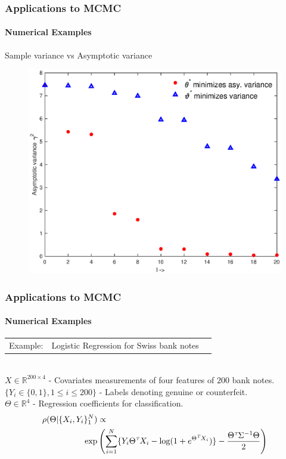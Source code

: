 \documentclass[xcolor=dvipsnames, subsection=false]{beamer}
\def\alertb#1{\alert{\color{BrickRed}  #1}}
\def\alertb#1{\alert{\color{BrickRed}  #1}}
\def\transpose{{\hbox{\it\tiny T}}}
\newcommand{\field}[1]{\mathbb{#1}}
\def\Re{\field{R}}
\newcommand{\pr}{\rho}
\begin{document}
\begin{frame}
\frametitle{Applications to MCMC}
\framesubtitle{Numerical Examples}
Sample variance vs Asymptotic variance
\begin{figure}[]
	\includegraphics[width = .6\hsize]{x_var_vs_asym_var.eps}
\end{figure}
\end{frame}

\begin{frame}
\frametitle{Applications to MCMC}
\framesubtitle{Numerical Examples}
\begin{tabular}{lll}\alertb{Example:}   & Logistic Regression for Swiss bank notes
	\\
\end{tabular}\\[0.3cm]
$X \in \Re^{200 \times 4}$ - Covariates measurements of four features of $200$ bank notes. \\[0.1cm]
$\{Y_i  \in \{0,1\}, 1 \leq i \leq 200 \}$ -  Labels denoting genuine or counterfeit. \\[0.1cm]
$\Theta \in \Re^4$ - Regression coefficients for classification.
\[
\begin{aligned}
\pr(\Theta| \{X_i,Y_i\}_1^N) & \propto \\ \exp & \left( \sum_{i=1}^N \{Y_i \Theta^\transpose X_i - \log(1+e^{\Theta^\transpose X_i} ) \} - \frac{\Theta^\transpose \Sigma^{-1} \Theta}{2}  \right)
\end{aligned}
\]
\end{frame}
\end{document}
